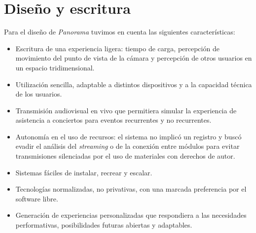 
\section*{Diseño y escritura} %

\color{BlueGreen}


\color{black}

Para el diseño de \textit{Panorama} tuvimos en cuenta las siguientes características:

\begin{itemize}
\item Escritura de una experiencia ligera: tiempo de carga, percepción de movimiento del punto de vista de la cámara y percepción de otros usuarios en un espacio tridimensional.  
\item Utilización sencilla, adaptable a distintos dispositivos y a la capacidad técnica de los usuarios.
\item Transmisión audiovisual en vivo que permitiera simular la experiencia de asistencia a conciertos para eventos recurrentes y no recurrentes. 
\item Autonomía en el uso de recursos: el sistema no implicó un registro y buscó evadir el análisis del \textit{streaming} o de la conexión entre módulos para evitar transmisiones silenciadas por el uso de materiales con derechos de autor. 
\item Sistemas fáciles de instalar, recrear y escalar.
\item Tecnologías normalizadas, no privativas, con una marcada preferencia por el software libre.
\item Generación de experiencias personalizadas que respondiera a las necesidades performativas, posibilidades futuras abiertas y adaptables. 
\end{itemize}

